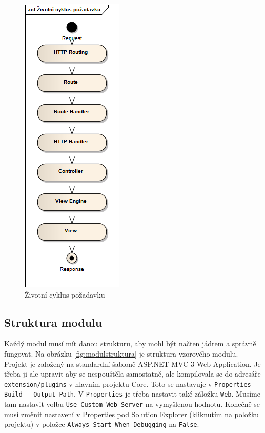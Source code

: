 \documentclass[11pt,twoside,a4paper]{book}
\begin{document}
\begin{figure}[h!]
\begin{center}
\includegraphics[scale=0.75]{figures/lifecycle}
\caption{Životní cyklus požadavku}
\label{fig:lifecycle}
\end{center}
\end{figure}

\subsection{Struktura modulu}
Každý modul musí mít danou strukturu, aby mohl být načten jádrem a správně fungovat.
Na obrázku \ref{fig:modulstruktura} je struktura vzorového modulu. Projekt je založený na standardní šabloně \textsf{ASP.NET MVC 3 Web Application}. Je třeba ji ale upravit aby se nespouštěla samostatně, ale kompilovala se do adresáře \texttt{extension/plugins} v hlavním projektu \textsf{Core}. Toto se nastavuje v \texttt{Properties - Build - Output Path}. V \texttt{Properties} je třeba nastavit také záložku \texttt{Web}. Musíme tam nastavit volbu \texttt{Use Custom Web Server} na vymyšlenou hodnotu. Konečně se musí změnit nastavení v Properties pod Solution Explorer (kliknutím na položku projektu) v položce \texttt{Always Start When Debugging} na \texttt{False}.
\end{document}
